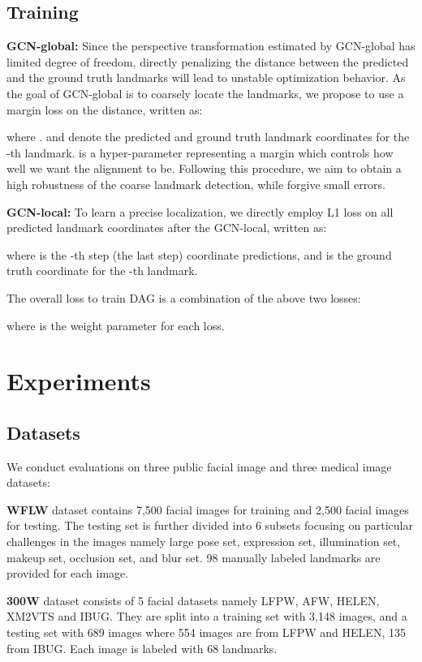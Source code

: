\documentclass[runningheads]{llncs}
\begin{document}
\subsection{Training}
\label{subsec:training}

\textbf{GCN-global:} Since the perspective transformation estimated by GCN-global has limited degree of freedom, directly penalizing the distance between the predicted and the ground truth landmarks will lead to unstable optimization behavior. As the goal of GCN-global is to coarsely locate the landmarks, we propose to use a margin loss on the  distance, written as:

where .  and  denote the predicted and ground truth landmark coordinates for the -th landmark.  is a hyper-parameter representing a margin which controls how well we want the alignment to be. Following this procedure, we aim to obtain a high robustness of the coarse landmark detection, while forgive small errors.

\textbf{GCN-local:} To learn a precise localization, we directly employ L1 loss on all predicted landmark coordinates after the GCN-local, written as:

where  is the -th step (the last step) coordinate predictions, and  is the ground truth coordinate for the -th landmark.

The overall loss to train DAG is a combination of the above two losses:

where  is the weight parameter for each loss.

\section{Experiments}
\subsection{Datasets} 

We conduct evaluations on three public facial image and three medical image datasets:

\noindent\textbf{WFLW} \cite{wu2018look} dataset contains 7,500 facial images for training and 2,500 facial images for testing. The testing set is further divided into 6 subsets focusing on particular challenges in the images namely large pose set, expression set, illumination set, makeup set, occlusion set, and blur set. 98 manually labeled landmarks are provided for each image.

\noindent\textbf{300W} \cite{sagonas2013300} dataset consists of 5 facial datasets namely LFPW, AFW, HELEN, XM2VTS and IBUG. They are split into a training set with 3,148 images, and a testing set with 689 images where 554 images are from LFPW and HELEN, 135 from IBUG. Each image is labeled with 68 landmarks.
\end{document}
